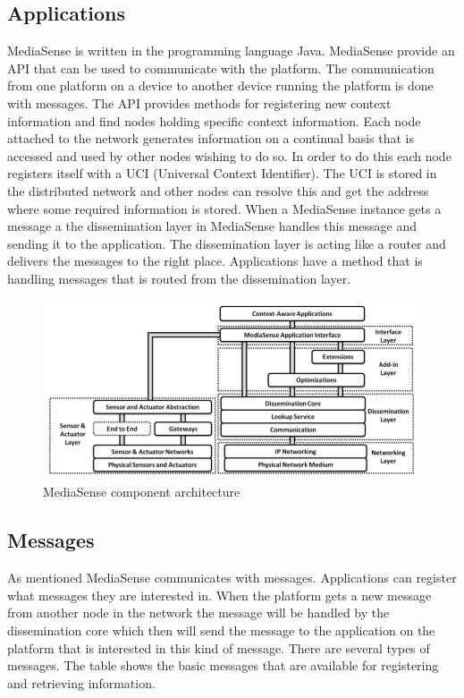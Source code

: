 \subsection{Applications}
MediaSense is written in the programming language Java. MediaSense provide an API that can be used to communicate with the platform. The communication from one platform on a device to another device running the platform is done with messages. The API provides methods for registering new context information and find nodes holding specific context information. Each node attached to the network generates information on a continual basis that is accessed and used by other nodes wishing to do so. In order to do this each node registers itself with a UCI (Universal Context Identifier). The UCI is stored in the distributed network and other nodes can resolve this and get the address where some required information is stored. When a MediaSense instance gets a message a the dissemination layer in MediaSense  handles this message and sending it to the application. The dissemination layer is acting like a router and delivers the messages to the right place. Applications have a method that is handling messages that is routed from the dissemination layer.

\begin{figure}[H]
	\centering
    	\includegraphics[scale=0.50]{part_2/mediasense/ms_arch.png}
		\caption{MediaSense component architecture} 
\end{figure}

\subsection{Messages}
As mentioned MediaSense communicates with messages. Applications can register what messages they are interested in. When the platform gets a new message from another node in the network the message will be handled by the dissemination core which then will send the message to the application on the platform that is interested in this kind of message. There are several types of messages. The table shows the basic messages that are available for registering and retrieving information. 

